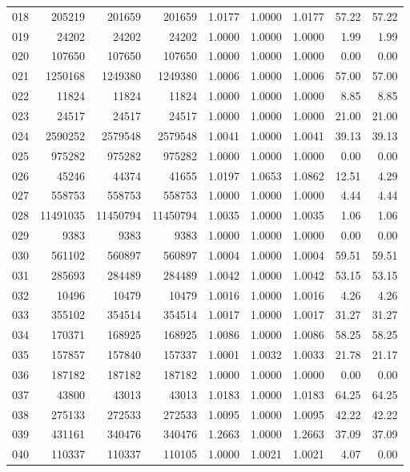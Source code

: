 \begin{longtable}{crrrrrrrr}
018 & 205219 & 201659 & 201659 & 1.0177 & 1.0000 & 1.0177 & 57.22 & 57.22 \\
019 & 24202 & 24202 & 24202 & 1.0000 & 1.0000 & 1.0000 & 1.99 & 1.99 \\
020 & 107650 & 107650 & 107650 & 1.0000 & 1.0000 & 1.0000 & 0.00 & 0.00 \\
021 & 1250168 & 1249380 & 1249380 & 1.0006 & 1.0000 & 1.0006 & 57.00 & 57.00 \\
022 & 11824 & 11824 & 11824 & 1.0000 & 1.0000 & 1.0000 & 8.85 & 8.85 \\
023 & 24517 & 24517 & 24517 & 1.0000 & 1.0000 & 1.0000 & 21.00 & 21.00 \\
024 & 2590252 & 2579548 & 2579548 & 1.0041 & 1.0000 & 1.0041 & 39.13 & 39.13 \\
025 & 975282 & 975282 & 975282 & 1.0000 & 1.0000 & 1.0000 & 0.00 & 0.00 \\
026 & 45246 & 44374 & 41655 & 1.0197 & 1.0653 & 1.0862 & 12.51 & 4.29 \\
027 & 558753 & 558753 & 558753 & 1.0000 & 1.0000 & 1.0000 & 4.44 & 4.44 \\
028 & 11491035 & 11450794 & 11450794 & 1.0035 & 1.0000 & 1.0035 & 1.06 & 1.06 \\
029 & 9383 & 9383 & 9383 & 1.0000 & 1.0000 & 1.0000 & 0.00 & 0.00 \\
030 & 561102 & 560897 & 560897 & 1.0004 & 1.0000 & 1.0004 & 59.51 & 59.51 \\
031 & 285693 & 284489 & 284489 & 1.0042 & 1.0000 & 1.0042 & 53.15 & 53.15 \\
032 & 10496 & 10479 & 10479 & 1.0016 & 1.0000 & 1.0016 & 4.26 & 4.26 \\
033 & 355102 & 354514 & 354514 & 1.0017 & 1.0000 & 1.0017 & 31.27 & 31.27 \\
034 & 170371 & 168925 & 168925 & 1.0086 & 1.0000 & 1.0086 & 58.25 & 58.25 \\
035 & 157857 & 157840 & 157337 & 1.0001 & 1.0032 & 1.0033 & 21.78 & 21.17 \\
036 & 187182 & 187182 & 187182 & 1.0000 & 1.0000 & 1.0000 & 0.00 & 0.00 \\
037 & 43800 & 43013 & 43013 & 1.0183 & 1.0000 & 1.0183 & 64.25 & 64.25 \\
038 & 275133 & 272533 & 272533 & 1.0095 & 1.0000 & 1.0095 & 42.22 & 42.22 \\
039 & 431161 & 340476 & 340476 & 1.2663 & 1.0000 & 1.2663 & 37.09 & 37.09 \\
040 & 110337 & 110337 & 110105 & 1.0000 & 1.0021 & 1.0021 & 4.07 & 0.00 \\

\end{longtable}
